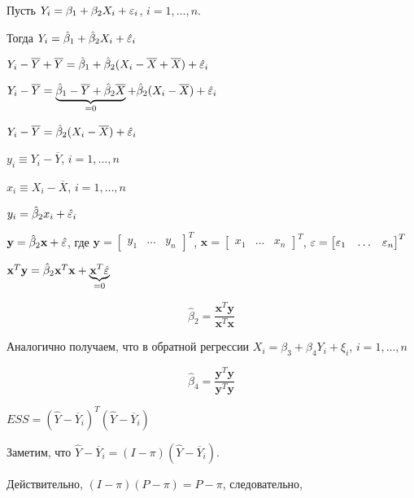 \documentclass[pdftex,11pt,openany]{book}
\begin{document}
\begin{solution}
Пусть $Y_i = \beta_1 + \beta_2 X_i + \varepsilon_i$, $i = 1, \ldots, n$.

Тогда $Y_i = \hat{\beta}_1 + \hat{\beta}_2 X_i + \hat{\varepsilon}_i$

$Y_i -  \overline{Y} + \overline{Y} = \hat{\beta}_1 + \hat{\beta}_2 (X_i -  \overline{X} + \overline{X}) + \hat{\varepsilon}_i$

$Y_i -  \overline{Y}  = \underbrace{\hat{\beta}_1 - \overline{Y} + \hat{\beta}_2 \overline{X}}_{=0} + \hat{\beta}_2 (X_i -  \overline{X}) + \hat{\varepsilon}_i$

$Y_i -  \overline{Y} = \hat{\beta}_2 (X_i -  \overline{X}) + \hat{\varepsilon}_i$

$y_i \equiv Y_i -  \overline{Y}$, $i = 1, \ldots, n$

$x_i \equiv X_i -  \overline{X}$, $i = 1, \ldots, n$

$y_i = \hat{\beta}_2 x_i + \hat{\varepsilon}_i$

$\textbf{y} = \hat{\beta}_2 \textbf{x} + \hat{\varepsilon}$, где $\textbf{y} = \begin{bmatrix}
y_1 & \ldots & y_n
\end{bmatrix}^T$, $\textbf{x} = \begin{bmatrix}
x_1 & \ldots & x_n
\end{bmatrix}^T$, $\varepsilon = \begin{bmatrix}
\varepsilon_1 & \ldots & \varepsilon_n
\end{bmatrix}^T$

$\textbf{x}^T \textbf{y} = \hat{\beta}_2 \textbf{x}^T \textbf{x} + \underbrace{\textbf{x}^T \hat{\varepsilon}}_{=0}$

\begin{equation}
\label{task20:direct_ols}\hat{\beta}_2 = \frac{\textbf{x}^T \textbf{y}}{\textbf{x}^T \textbf{x}}
\end{equation}

Аналогично получаем, что в обратной регрессии $X_i = \beta_3 + \beta_4 Y_i + \xi_i$, $i = 1, \ldots, n$

\begin{equation}
\label{task20:reverse_ols}\hat{\beta}_4 = \frac{\textbf{y}^T \textbf{y}}{\textbf{y}^T \textbf{y}}
\end{equation}

$ESS = (\hat{Y} - \overline{Y}_i)^T(\hat{Y} - \overline{Y}_i)$

Заметим, что $\hat{Y} - \overline{Y}_i = (I - \pi)(\hat{Y} - \overline{Y}_i)$.

Действительно, $(I - \pi)(P - \pi) = P - \pi$, следовательно,


\end{solution}
\end{document}
